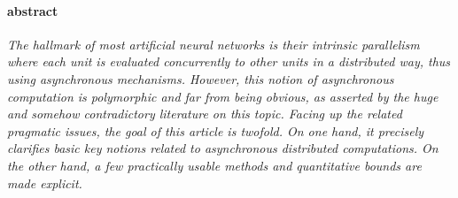 \paragraph{abstract}
\textit{The hallmark of most artificial neural networks is their intrinsic parallelism
where each unit is evaluated concurrently to other units in a distributed way,
thus using {\em asynchronous} mechanisms.  However, this notion of asynchronous
computation is polymorphic and far from being obvious, as asserted by the
huge and somehow contradictory literature on this topic. Facing up the
related pragmatic issues, the goal of this article is twofold.  On
one hand, it precisely clarifies basic key notions related to asynchronous
distributed computations. On the other hand, a few practically usable methods
and quantitative bounds are made explicit.}

